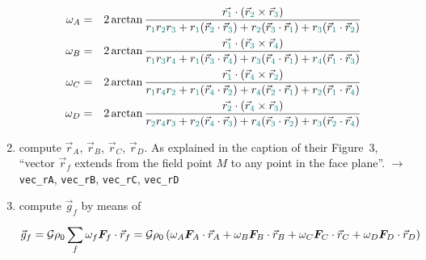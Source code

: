 \begin{enumerate}
\begin{eqnarray}
\omega_A &=& 
2 \arctan \frac{\vec{r_{\color{teal}1}} \cdot (\vec{r}_{\color{teal}2} \times \vec{r}_{\color{teal}3})}{r_{\color{teal}1}r_{\color{teal}2}r_{\color{teal}3} 
+r_{\color{teal}1}(\vec{r}_{\color{teal}2}\cdot\vec{r}_{\color{teal}3}) 
+r_{\color{teal}2}(\vec{r}_{\color{teal}3}\cdot\vec{r}_{\color{teal}1}) 
+r_{\color{teal}3}(\vec{r}_{\color{teal}1}\cdot\vec{r}_{\color{teal}2})  } \nonumber\\
\omega_B &=& 
2 \arctan \frac{\vec{r_{\color{teal}1}} \cdot (\vec{r}_{\color{teal}3} \times \vec{r}_{\color{teal}4})}{r_{\color{teal}1}r_{\color{teal}3}r_{\color{teal}4} 
+r_{\color{teal}1}(\vec{r}_{\color{teal}3}\cdot\vec{r}_{\color{teal}4}) 
+r_{\color{teal}3}(\vec{r}_{\color{teal}4}\cdot\vec{r}_{\color{teal}1}) 
+r_{\color{teal}4}(\vec{r}_{\color{teal}1}\cdot\vec{r}_{\color{teal}3})  } \nonumber\\
\omega_C &=&
2 \arctan \frac{\vec{r_{\color{teal}1}} \cdot (\vec{r}_{\color{teal}4} \times \vec{r}_{\color{teal}2})}{r_{\color{teal}1}r_{\color{teal}4}r_{\color{teal}2}
+r_{\color{teal}1}(\vec{r}_{\color{teal}4}\cdot\vec{r}_{\color{teal}2}) 
+r_{\color{teal}4}(\vec{r}_{\color{teal}2}\cdot\vec{r}_{\color{teal}1}) 
+r_{\color{teal}2}(\vec{r}_{\color{teal}1}\cdot\vec{r}_{\color{teal}4}) 
} \nonumber\\
\omega_D &=&
2 \arctan \frac{\vec{r_{\color{teal}2}} \cdot (\vec{r}_{\color{teal}4} \times \vec{r}_{\color{teal}3})}{r_{\color{teal}2}r_{\color{teal}4}r_{\color{teal}3} 
+r_{\color{teal}2}(\vec{r}_{\color{teal}4}\cdot\vec{r}_{\color{teal}3}) 
+r_{\color{teal}4}(\vec{r}_{\color{teal}3}\cdot\vec{r}_{\color{teal}2}) 
+r_{\color{teal}3}(\vec{r}_{\color{teal}2}\cdot\vec{r}_{\color{teal}4}) 
}
\end{eqnarray}


\item compute $\vec{r}_{A}$, $\vec{r}_{B}$, $\vec{r}_{C}$, $\vec{r}_{D}$.
As explained in the caption of their Figure~3, ``vector $\vec{r}_f$
extends from the field point $M$ to any point in the face plane''.
$\rightarrow$ \verb|vec_rA|, \verb|vec_rB|, \verb|vec_rC|, \verb|vec_rD|

\item compute $\vec{g}_f$ by means of %

\[
\vec{g}_f
= {\cal G} \rho_0 \sum_f \omega_f {\bm F}_f\cdot \vec{r}_f \nonumber\\
= {\cal G} \rho_0 \left(
\omega_A {\bm F}_A\cdot \vec{r}_A +
\omega_B {\bm F}_B\cdot \vec{r}_B +
\omega_C {\bm F}_C\cdot \vec{r}_C +
\omega_D {\bm F}_D\cdot \vec{r}_D 
\right)
\]





\end{enumerate}
